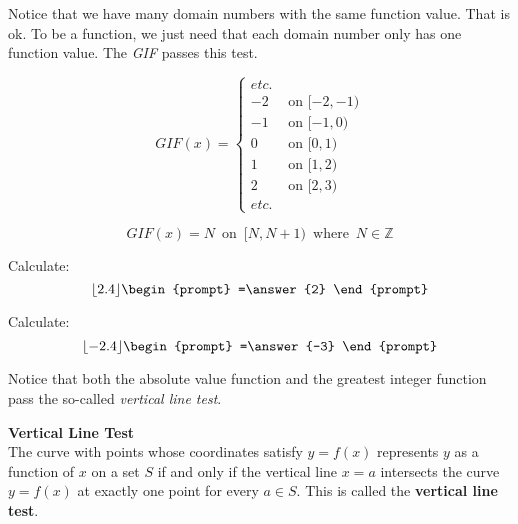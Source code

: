 \documentclass{ximera}
\begin{document}
Notice that we have many domain numbers with the same function value. That is ok. To be a function, we just need that each domain number only has one function value.  The \textit{GIF} passes this test.






\[
GIF(x) = 
\begin{cases}
   etc. &    \\
  -2 & \text{ on } [-2, -1) \\
  -1 & \text{ on } [-1, 0) \\ 
   0 & \text{ on } [0, 1) \\
  1 & \text{ on } [1, 2) \\
   2 & \text{ on } [2, 3) \\
  etc. &  
\end{cases}
\]


\[
GIF(x) = N \, \text{ on } \, [N, N+1) \, \text{ where } \, N \in \mathbb{Z}
\]


\begin{question}
  Calculate:
  \[
  \lfloor 2.4 \rfloor
  \begin{prompt}
    =\answer{2}
  \end{prompt}
  \]
  \end{question}

  \begin{question}
  Calculate:
  \[
  \lfloor -2.4 \rfloor
  \begin{prompt}
    =\answer{-3}
  \end{prompt}
  \]
\end{question}





Notice that both the absolute value function and the greatest integer function pass the so-called \textit{vertical line test}.

\begin{theorem} \textbf{\textcolor{green!50!black}{Vertical Line Test}}   \\


The curve with points whose coordinates satisfy $y=f(x)$ represents $y$ as a function of $x$ on a set $S$ if and only if the vertical line $x=a$ intersects the curve $y=f(x)$ at exactly one point for every $a \in S$. This is called the \textbf{vertical line test}.
\end{theorem}
\end{document}
